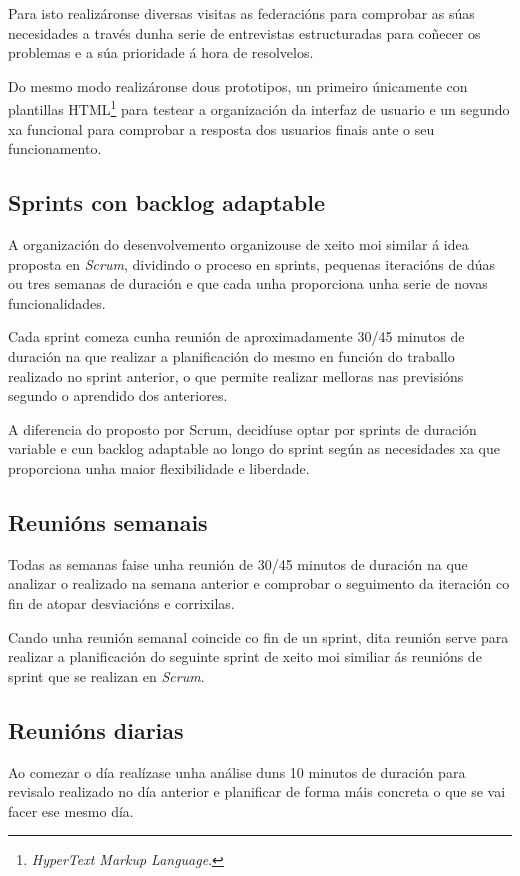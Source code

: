     Para isto realizáronse diversas visitas as federacións para comprobar as 
súas necesidades a través dunha serie de entrevistas estructuradas para 
coñecer os problemas e a súa prioridade á hora de resolvelos.

    Do mesmo modo realizáronse dous prototipos, un primeiro únicamente 
con plantillas HTML\footnote{\emph{HyperText Markup Language}.} para testear a 
organización da interfaz de usuario e un 
segundo xa funcional para comprobar a resposta dos usuarios finais ante o seu 
funcionamento.

    \subsection{Sprints con backlog adaptable}
    A organización do desenvolvemento organizouse de xeito moi similar á idea 
proposta en \emph{Scrum}, dividindo o proceso en sprints, pequenas iteracións 
de dúas ou tres semanas de duración e que cada unha proporciona unha serie de 
novas funcionalidades.

    Cada sprint comeza cunha reunión de aproximadamente 30/45 minutos de 
duración na que realizar a planificación do mesmo en función do 
traballo realizado no sprint anterior, o que permite realizar melloras nas 
previsións segundo o aprendido dos anteriores.

    A diferencia do proposto por Scrum, decidíuse optar por sprints de duración 
variable e cun backlog adaptable ao longo do sprint según as necesidades xa que 
proporciona unha maior flexibilidade e liberdade.

    \subsection{Reunións semanais}
    Todas as semanas faise unha reunión de 30/45 minutos de duración na que 
analizar o realizado na semana anterior e comprobar o seguimento da iteración 
co fin de atopar desviacións e corrixilas.

    Cando unha reunión semanal coincide co fin de un sprint, dita reunión 
serve para realizar a planificación do seguinte sprint de xeito moi similiar ás 
reunións de sprint que se realizan en \emph{Scrum}.

    \subsection{Reunións diarias}
    Ao comezar o día realízase unha análise duns 10 minutos de duración para 
revisalo realizado no día anterior e planificar de forma máis concreta o que 
se vai facer ese mesmo día.

